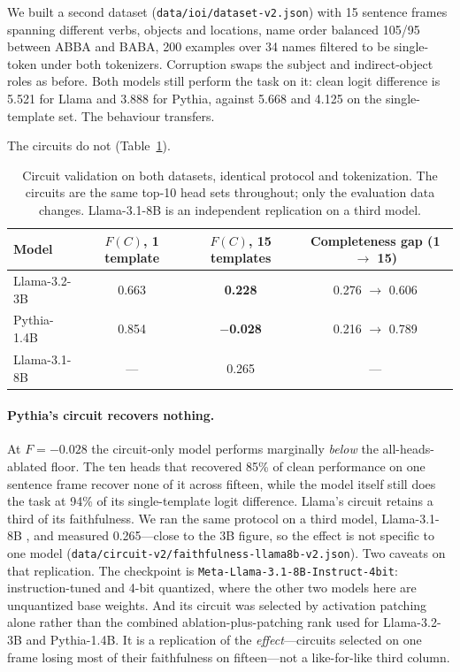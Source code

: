\documentclass[11pt,a4paper]{article}
\begin{document}
We built a second dataset (\texttt{data/ioi/dataset-v2.json}) with 15 sentence frames
spanning different verbs, objects and locations, name order balanced 105/95 between ABBA
and BABA, 200 examples over 34 names filtered to be single-token under both tokenizers.
Corruption swaps the subject and indirect-object roles as before. Both models still
perform the task on it: clean logit difference is 5.521 for Llama and 3.888 for Pythia,
against 5.668 and 4.125 on the single-template set. The behaviour transfers.

The circuits do not (Table~\ref{tab:template}).

\begin{table}[H]
  \centering
  \caption{Circuit validation on both datasets, identical protocol and tokenization.
    The circuits are the same top-10 head sets throughout; only the evaluation data
    changes. Llama-3.1-8B is an independent replication on a third model.}
  \label{tab:template}
  \smallskip
  \small\setlength{\tabcolsep}{4pt}
  \begin{tabular}{lccc}
    \toprule
    Model & $F(C)$, 1 template & $F(C)$, 15 templates & Completeness gap (1 $\to$ 15) \\
    \midrule
    Llama-3.2-3B & 0.663 & \textbf{0.228} & 0.276 $\to$ 0.606 \\
    Pythia-1.4B  & 0.854 & \textbf{$-$0.028} & 0.216 $\to$ 0.789 \\
    Llama-3.1-8B & --- & 0.265 & --- \\
    \bottomrule
  \end{tabular}
\end{table}

\paragraph{Pythia's circuit recovers nothing.} At $F = -0.028$ the circuit-only model
performs marginally \emph{below} the all-heads-ablated floor. The ten heads that recovered
85\% of clean performance on one sentence frame recover none of it across fifteen, while
the model itself still does the task at 94\% of its single-template logit difference.
Llama's circuit retains a third of its faithfulness. We ran the same protocol on a third
model, Llama-3.1-8B \citep{meta2024llama3}, and measured 0.265---close to the 3B figure, so
the effect is not specific to one model (\texttt{data/circuit-v2/faithfulness-llama8b-v2.json}).
Two caveats on that replication. The checkpoint is
\texttt{Meta-Llama-3.1-8B-Instruct-4bit}: instruction-tuned and 4-bit quantized, where the
other two models here are unquantized base weights. And its circuit was selected by
activation patching alone rather than the combined ablation-plus-patching rank used for
Llama-3.2-3B and Pythia-1.4B. It is a replication of the \emph{effect}---circuits selected
on one frame losing most of their faithfulness on fifteen---not a like-for-like third column.
\end{document}
